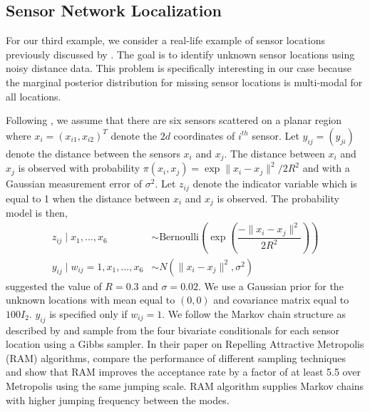 \documentclass[11pt]{article}
\theoremstyle{remark}
\begin{document}






\subsection{Sensor Network Localization}

For our third example, we consider a real-life example of sensor locations previously discussed by \cite{ihler2005nonparametric}. The goal is to identify unknown sensor locations using noisy distance data. This problem is specifically interesting in our case because the marginal posterior distribution for missing sensor locations is multi-modal for all locations. 

Following \cite{tak2018repelling}, we assume that there are six sensors scattered on a planar region where $x_i = (x_{i1}, x_{i2})^T$ denote the $2d$ coordinates of $i^{th}$ sensor. Let $y_{ij} = (y_{ji})$ denote the distance between the sensors $x_i$ and $x_j$. The distance between $x_i$ and $x_j$ is observed with probability $\pi (x_i, x_j) = \exp{\|x_i - x_j\|^2 / 2R^2}$ and with a Gaussian measurement error of $\sigma^2$. Let $z_{ij}$ denote the indicator variable which is equal to 1 when the distance between $x_i$ and $x_j$ is observed. The probability model is then,
%
\begin{align*}
    z_{ij} \mid x_1, ..., x_6 & \sim \text{Bernoulli}\left(\exp\left(\dfrac{-\|x_i - x_j\|^2}{2R^2}\right)\right)\\
    y_{ij} \mid w_{ij} = 1, x_1, ..., x_6 &\sim N(\|x_i - x_j\|^2, \sigma^2)
\end{align*}
%
\cite{ahn2013distributed} suggested the value of $R = 0.3$ and $\sigma = 0.02$. We use a Gaussian prior for the unknown locations with  mean equal to $(0,0)$ and covariance matrix equal to $100 I_2$. $y_{ij}$ is specified only if $w_{ij} = 1$. We follow the Markov chain structure as described by \cite{tak2018repelling} and sample from the four bivariate conditionals for each sensor location using a Gibbs sampler. In their paper on Repelling Attractive Metropolis (RAM) algorithms, \cite{tak2018repelling} compare the performance of different sampling techniques and show that RAM improves the acceptance rate by a factor of at least 5.5 over Metropolis using the same jumping scale. RAM algorithm supplies Markov chains with higher jumping frequency between the modes.
\end{document}
